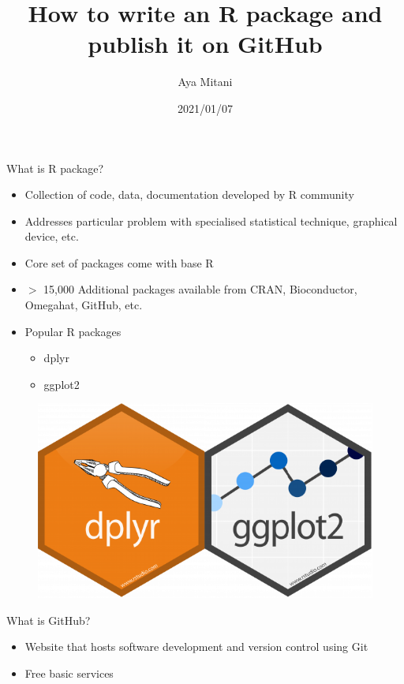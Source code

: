 \documentclass[
  ignorenonframetext,
]{beamer}
\title{How to write an R package and publish it on GitHub}
\author{Aya Mitani}
\date{2021/01/07}
\providecommand{\tightlist}{%
  \setlength{\itemsep}{0pt}\setlength{\parskip}{0pt}}
\begin{document}
\frame{\titlepage}

\begin{frame}{What is R package?}
\protect\hypertarget{what-is-r-package}{}

\begin{itemize}
\tightlist
\item
  Collection of code, data, documentation developed by R community
\item
  Addresses particular problem with specialised statistical technique,
  graphical device, etc.
\item
  Core set of packages come with base R
\item
  \(>\) 15,000 Additional packages available from CRAN, Bioconductor,
  Omegahat, GitHub, etc.
\item
  Popular R packages

  \begin{itemize}
  \tightlist
  \item
    dplyr
  \item
    ggplot2
  \end{itemize}
\end{itemize}

\begin{figure}
  \includegraphics[scale=0.2]{slides_files/figure-beamer/dplyrggplot2.png}
\end{figure}

\end{frame}

\begin{frame}{What is GitHub?}
\protect\hypertarget{what-is-github}{}

\begin{itemize}
\tightlist
\item
  Website that hosts software development and version control using Git
\item
  Free basic services
\end{itemize}

\end{frame}
\end{document}
